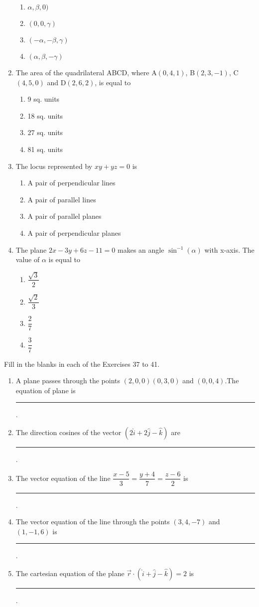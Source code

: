 \begin{enumerate}[label=\thesection.\arabic*,ref=\thesection.\theenumi]
\begin{enumerate}
	\item $\alpha,\beta,0)$
	\item $(0,0,\gamma)$
	\item $(-\alpha,-\beta,\gamma)$
	\item $(\alpha,\beta,-\gamma)$
\end{enumerate}
\item The area of the quadrilateral ABCD, where A$(0,4,1)$, B$(2,3,-1)$, C$(4,5,0)$ and D$(2,6,2)$, is equal to 
\begin{enumerate}
	\item 9 sq. units
	\item 18 sq. units 
	\item 27 sq. units 
	\item 81 sq. units
\end{enumerate}
\item The locus represented by $xy+yz=0$ is 
\begin{enumerate}
	\item A pair of perpendicular lines
	\item A pair of parallel lines
	\item A pair of parallel planes 
	\item A pair of perpendicular planes
\end{enumerate}
\item The plane $2x-3y+6z-11=0$ makes an angle $\sin^{-1}(\alpha)$ with x-axis. The value of $\alpha$ is equal to 
\begin{enumerate}
	\item  $\dfrac{\sqrt{3}}{2}$
	\item  $\dfrac{\sqrt{2}}{3}$
	\item  $\dfrac{2}{7}$
	\item  $\dfrac{3}{7}$
\end{enumerate}
\end{enumerate}
Fill in the blanks in each of the Exercises 37 to 41.
\begin{enumerate}[resume]
\item A plane passes through the points $(2,0,0) (0,3,0)$ and $(0,0,4)$.The equation of plane is \noindent\rule{2cm}{0.4pt}.
\item The direction cosines of the vector $(2\hat{i}+2\hat{j}-\hat{k})$ are \noindent\rule{2cm}{0.4pt}.
\item The vector equation of the line $\dfrac{x-5}{3}=\dfrac{y+4}{7}=\dfrac{z-6}{2}$ is \noindent\rule{2cm}{0.4pt}. 
\item The vector equation of the line through the points $(3,4,-7)$ and $(1,-1,6)$ is \noindent\rule{2cm}{0.4pt}.
\item The cartesian equation of the plane $\overrightarrow{r} \cdot (\hat{i}+\hat{j}-\hat{k})=2$ is \noindent\rule{2cm}{0.4pt}.
\end{enumerate}
